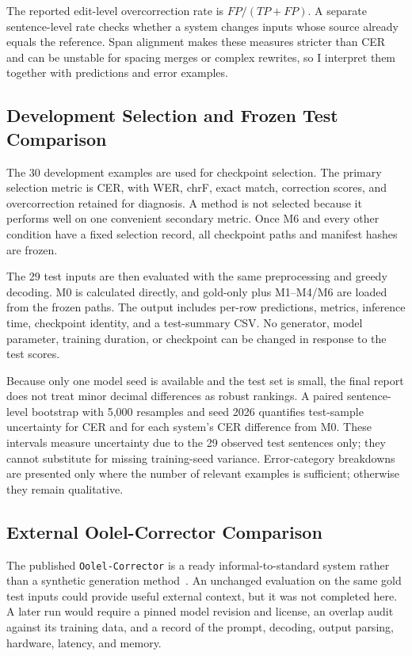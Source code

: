 \documentclass[12pt, a4paper, twoside, openany]{report}
\begin{document}
The reported edit-level overcorrection rate is $FP/(TP+FP)$. A separate sentence-level rate checks whether a system changes inputs whose source already equals the reference. Span alignment makes these measures stricter than CER and can be unstable for spacing merges or complex rewrites, so I interpret them together with predictions and error examples.


\subsection{Development Selection and Frozen Test Comparison}

The 30 development examples are used for checkpoint selection. The primary selection metric is CER, with WER, chrF, exact match, correction scores, and overcorrection retained for diagnosis. A method is not selected because it performs well on one convenient secondary metric. Once M6 and every other condition have a fixed selection record, all checkpoint paths and manifest hashes are frozen.

The 29 test inputs are then evaluated with the same preprocessing and greedy decoding. M0 is calculated directly, and gold-only plus M1--M4/M6 are loaded from the frozen paths. The output includes per-row predictions, metrics, inference time, checkpoint identity, and a test-summary CSV. No generator, model parameter, training duration, or checkpoint can be changed in response to the test scores.

Because only one model seed is available and the test set is small, the final report does not treat minor decimal differences as robust rankings. A paired sentence-level bootstrap with 5,000 resamples and seed 2026 quantifies test-sample uncertainty for CER and for each system's CER difference from M0. These intervals measure uncertainty due to the 29 observed test sentences only; they cannot substitute for missing training-seed variance. Error-category breakdowns are presented only where the number of relevant examples is sufficient; otherwise they remain qualitative.


\subsection{External Oolel-Corrector Comparison}

The published \texttt{Oolel-Corrector} is a ready informal-to-standard system rather than a synthetic generation method~\cite{soynade2026oolel}. An unchanged evaluation on the same gold test inputs could provide useful external context, but it was not completed here. A later run would require a pinned model revision and license, an overlap audit against its training data, and a record of the prompt, decoding, output parsing, hardware, latency, and memory.
\end{document}
